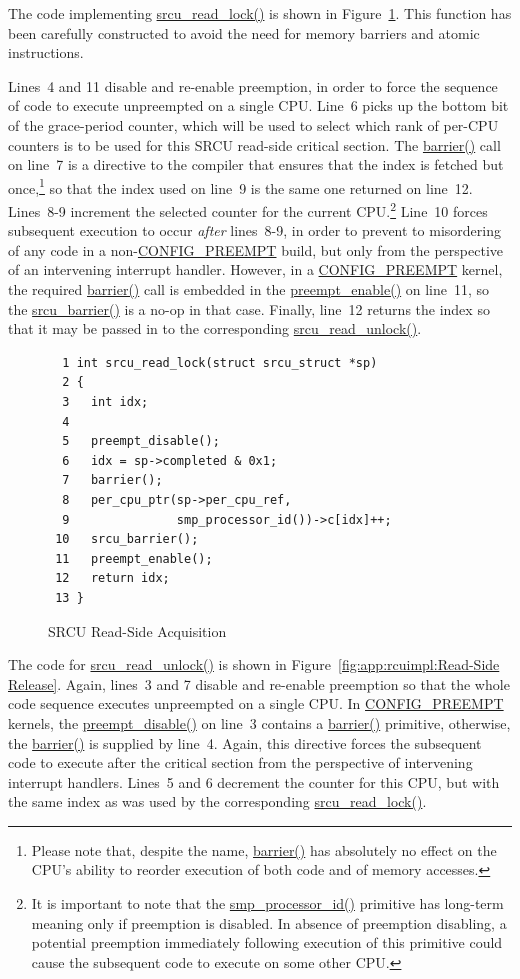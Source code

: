 The code implementing \url{srcu_read_lock()} is shown in
Figure~\ref{fig:app:rcuimpl:Read-Side Acquisition}.
This function has been carefully constructed to avoid the
need for memory barriers and atomic instructions.

Lines~4 and 11 disable and re-enable preemption, in order to force
the sequence of code to execute unpreempted on a single CPU.
Line~6 picks up the bottom bit of the grace-period counter, which will
be used to select which rank of per-CPU counters is to be used for this
SRCU read-side critical section.
The \url{barrier()} call on line~7 is a directive to the compiler
that ensures that the index is
fetched but once,\footnote{
	Please note that, despite the name, \url{barrier()}
	has absolutely no effect on the CPU's ability to
	reorder execution of both code and of memory accesses.}
so that the index used on line~9 is the same
one returned on line~12.
Lines~8-9 increment the selected counter for the current CPU.\footnote{
	It is important to note that the \url{smp_processor_id()} primitive
	has long-term meaning only if preemption is disabled.
	In absence of preemption disabling, a potential preemption
	immediately following execution of this primitive could
	cause the subsequent code to execute on some other CPU.}
Line~10 forces subsequent execution to occur \emph{after}
lines~8-9, in order to prevent to misordering of any code
in a non-\url{CONFIG_PREEMPT} build, but only
from the perspective of an intervening interrupt handler.
However, in a \url{CONFIG_PREEMPT} kernel, the required \url{barrier()}
call is embedded in the \url{preempt_enable()} on line~11, so the
\url{srcu_barrier()} is a no-op in that case.
Finally, line~12 returns the index so that it may be passed in to the
corresponding \url{srcu_read_unlock()}.

\begin{figure}[htbp]
{ \scriptsize
\begin{verbatim}
  1 int srcu_read_lock(struct srcu_struct *sp)
  2 {
  3   int idx;
  4 
  5   preempt_disable();
  6   idx = sp->completed & 0x1;
  7   barrier();
  8   per_cpu_ptr(sp->per_cpu_ref,
  9               smp_processor_id())->c[idx]++;
 10   srcu_barrier();
 11   preempt_enable();
 12   return idx;
 13 }
\end{verbatim}
}
\caption{SRCU Read-Side Acquisition}
\label{fig:app:rcuimpl:Read-Side Acquisition}
\end{figure}

The code for \url{srcu_read_unlock()} is shown in
Figure~\ref{fig:app:rcuimpl:Read-Side Release}.
Again, lines~3 and 7 disable and re-enable preemption so that the
whole code sequence executes unpreempted on a single CPU.
In \url{CONFIG_PREEMPT} kernels, the \url{preempt_disable()} on line~3
contains a \url{barrier()} primitive, otherwise, the \url{barrier()}
is supplied by line~4.
Again, this directive forces the subsequent code to execute after
the critical section from the perspective of intervening
interrupt handlers.
Lines~5 and 6 decrement the counter for this CPU, but with the same
index as was used by the corresponding \url{srcu_read_lock()}.

